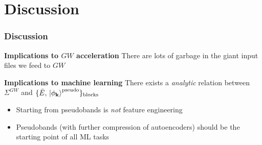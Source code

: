 \documentclass[t]{beamer}
\begin{document}
\section{Discussion}

\begin{frame}
\frametitle{Discussion}
    
\textbf{Implications to $GW$ acceleration} There are lots of garbage in the giant input files we feed to $GW$

\textbf{Implications to machine learning} There exists a \emph{analytic} relation between $\Sigma^{GW}$ and $\{\bar{E}, \ket*{\phi_{\vb{k}}}^{\text{pseudo}} \}_{\text{blocks}}$

\begin{itemize}
    \item Starting from pseudobands is \emph{not} feature engineering
    \item Pseudobands (with further compression of autoencoders) should be the starting point of all ML tasks
\end{itemize}

\end{frame}
\end{document}
